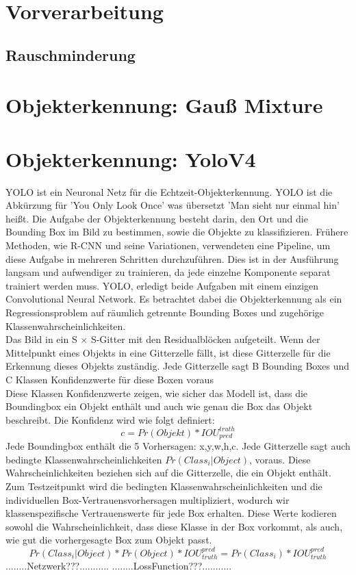 \documentclass[conference]{IEEEtran}
\begin{document}
	\section{Vorverarbeitung}
	
	\subsection{Rauschminderung}
	
	\section{Objekterkennung: Gauß Mixture}
	
	\section{Objekterkennung: YoloV4}
	YOLO ist ein Neuronal Netz für die Echtzeit-Objekterkennung. YOLO ist die Abkürzung für 'You Only Look Once' was übersetzt 'Man sieht nur einmal hin' heißt. Die Aufgabe der Objekterkennung besteht darin, den Ort und die Bounding Box im Bild zu bestimmen, sowie die Objekte zu klassifizieren. Frühere Methoden, wie R-CNN und seine Variationen, verwendeten eine Pipeline, um diese Aufgabe in mehreren Schritten durchzuführen. Dies ist in der Ausführung langsam und aufwendiger zu trainieren, da jede einzelne Komponente separat trainiert werden muss. YOLO, erledigt beide Aufgaben mit einem einzigen Convolutional Neural Network. Es betrachtet dabei die Objekterkennung als ein Regressionsproblem auf räumlich getrennte Bounding Boxes und zugehörige Klassenwahrscheinlichkeiten.\cite{b1}\\
	Das Bild in ein S × S-Gitter mit den Residualblöcken aufgeteilt. Wenn der Mittelpunkt eines Objekts in eine Gitterzelle fällt, ist diese Gitterzelle für die Erkennung dieses Objekts zuständig. Jede Gitterzelle sagt B Bounding Boxes und C Klassen Konfidenzwerte für diese Boxen voraus \cite{b1}\\
	Diese Klassen Konfidenzwerte zeigen, wie sicher das Modell ist, dass die Boundingbox ein Objekt enthält und auch wie genau die Box das Objekt beschreibt. Die Konfidenz wird wie folgt definiert:
	\[ c = Pr(Objekt) * IOU_{pred}^{truth} \]
	Jede Boundingbox enthält die 5 Vorhersagen: x,y,w,h,c.
	Jede Gitterzelle sagt auch bedingte Klassenwahrscheinlichkeiten $Pr(Class_{i}|Object)$, voraus.  Diese Wahrscheinlichkeiten beziehen sich auf die Gitterzelle, die ein Objekt enthält.
	Zum Testzeitpunkt wird die bedingten Klassenwahrscheinlichkeiten und die individuellen Box-Vertrauensvorhersagen multipliziert, wodurch wir klassenspezifische Vertrauenswerte für jede Box erhalten.  Diese Werte kodieren sowohl die Wahrscheinlichkeit, dass diese Klasse in der Box vorkommt, als auch, wie gut die vorhergesagte Box zum Objekt passt.
	\[ Pr(Class_{i}|Object)*Pr(Object)*IOU_{truth}^{pred}= Pr(Class_{i})*IOU_{truth}^{pred} \]
	........Netzwerk???...........
	........LossFunction???...........
	
\end{document}
